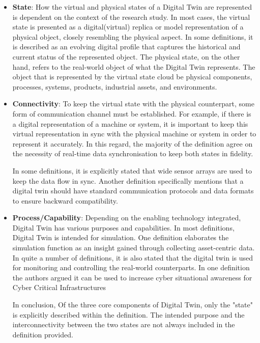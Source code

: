 \begin{itemize}
    \item \textbf{State}: How the virtual and physical states of a Digital Twin are represented is dependent on the context of the research study. In most cases, the virtual state is presented as a digital(virtual) replica or model representation of a physical object, closely resembling the physical aspect. In some definitions, it is described as an evolving digital profile that captures the historical and current status of the represented object. The physical state, on the other hand, refers to the real-world object of what the Digital Twin represents. The object that is represented by the virtual state cloud be physical components, processes, systems, products, industrial assets, and environments.

    \item \textbf{Connectivity}: To keep the virtual state with the physical counterpart, some form of communication channel must be established. For example, if there is a digital representation of a machine or system, it is important to keep this virtual representation in sync with the physical machine or system in order to represent it accurately. In this regard, the majority of the definition agree on the necessity of real-time data synchronisation to keep both states in fidelity.
    
    In some definitions, it is explicitly stated that wide sensor arrays are used to keep the data flow in sync. Another definition specifically mentions that a digital twin should have standard communication protocols and data formats to ensure backward compatibility.   

 
    \item \textbf{Process/Capability}: Depending on the enabling technology integrated, Digital Twin has various purposes and capabilities.  In most definitions, Digital Twin is intended for simulation. One definition elaborates the simulation function as an insight gained through collecting asset-centric data. In quite a number of definitions, it is also stated that the digital twin is used for monitoring and controlling the real-world counterparts. In one definition the authors argued it can be used to increase cyber situational awareness for Cyber Critical Infrastructures


    In conclusion, Of the three core components of Digital Twin, only the "state" is explicitly described within the definition. The intended purpose and the interconnectivity between the two states are not always included in the definition provided.



    
\end{itemize}

